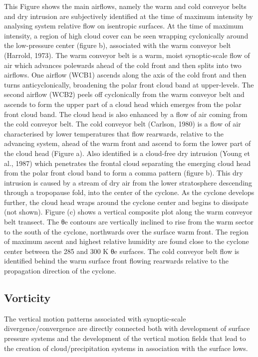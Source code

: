 \documentclass[12pt,oneside]{book}
\begin{document}
This Figure shows the main airflows, namely the warm and cold conveyor
belts and dry intrusion are subjectively identified at the time of
maximum intensity by analysing system relative flow on isentropic
surfaces. At the time of maximum intensity, a region of high cloud cover
can be seen wrapping cyclonically around the low-pressure center (figure
b), associated with the warm conveyor belt (Harrold, 1973). The warm
conveyor belt is a warm, moist synoptic-scale flow of air which advances
polewards ahead of the cold front and then splits into two airflows. One
airflow (WCB1) ascends along the axis of the cold front and then turns
anticyclonically, broadening the polar front cloud band at upper-levels.
The second airflow (WCB2) peels off cyclonically from the warm conveyor
belt and ascends to form the upper part of a cloud head which emerges
from the polar front cloud band. The cloud head is also enhanced by a
flow of air coming from the cold conveyor belt. The cold conveyor belt
(Carlson, 1980) is a flow of air characterised by lower temperatures
that flow rearwards, relative to the advancing system, ahead of the warm
front and ascend to form the lower part of the cloud head (Figure a).
Also identified is a cloud-free dry intrusion (Young et al., 1987) which
penetrates the frontal cloud separating the emerging cloud head from the
polar front cloud band to form a comma pattern (figure b). This dry
intrusion is caused by a stream of dry air from the lower stratosphere
descending through a tropopause fold, into the center of the cyclone. As
the cyclone develops further, the cloud head wraps around the cyclone
center and begins to dissipate (not shown). Figure (c) shows a vertical
composite plot along the warm conveyor belt transect. The θe contours
are vertically inclined to rise from the warm sector to the south of the
cyclone, northwards over the surface warm front. The region of maximum
ascent and highest relative humidity are found close to the cyclone
center between the 285 and 300 K θe surfaces. The cold conveyor belt
flow is identified behind the warm surface front flowing rearwards
relative to the propagation direction of the cyclone.

\subsection{Vorticity}\label{vorticity}

The vertical motion patterns associated with synoptic-scale
divergence/convergence are directly connected both with development of
surface pressure systems and the development of the vertical motion
fields that lead to the creation of cloud/precipitation systems in
association with the surface lows.
\end{document}
